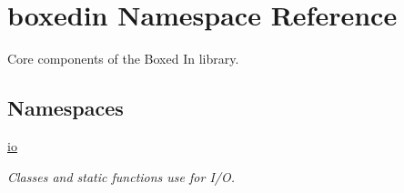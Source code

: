 \hypertarget{namespaceboxedin}{\section{boxedin Namespace Reference}
\label{namespaceboxedin}
}


Core components of the Boxed In library.  


\subsection*{Namespaces}
\begin{DoxyCompactItemize}
\item 
 \hyperlink{namespaceboxedin_1_1io}{io}
\begin{DoxyCompactList}\small\item\em Classes and static functions use for I/\+O. \end{DoxyCompactList}\end{DoxyCompactItemize}

